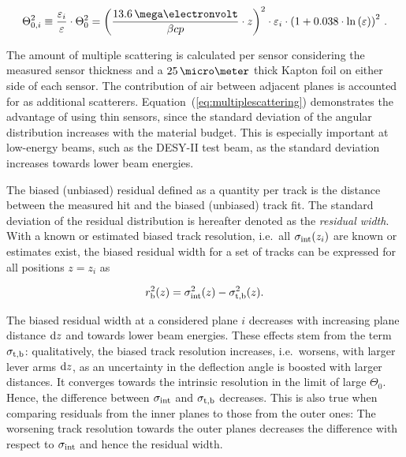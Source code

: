 \begin{equation}
\label{eq:multiplescattering}
\Theta_{0,i}^{2} \equiv \dfrac{\varepsilon_i}{\varepsilon} \cdot \Theta_{0}^{2} = \left( \frac{13.6\,\mega\electronvolt}{\beta c p} \cdot z \right)^2
\cdot \varepsilon_i
\cdot \left( 1 + 0.038 \cdot \ln{\left( \varepsilon \right) } \right)^2 \,.
\end{equation}

The amount of multiple scattering is calculated per sensor considering the measured sensor thickness and a $25\,\micro\meter$ thick Kapton foil on either side of each sensor.
The contribution of air between adjacent planes is accounted for as additional scatterers. 
Equation~(\ref{eq:multiplescattering}) demonstrates the advantage of using thin sensors, since the standard deviation of the angular distribution increases with the material budget.
This is especially important at low-energy beams, such as the DESY-II test beam, as the standard deviation increases towards lower beam energies.

The biased (unbiased) residual defined as a quantity per track is the distance between the measured hit and the biased (unbiased) track fit. 
The standard deviation of the residual distribution is hereafter denoted as the \textit{residual width}. 
With a known or estimated biased track resolution, i.e.\ all $\sigma_{\textrm{int}}(z_i)$ are known or estimates exist,
 the \textrm{biased} residual width for a set of tracks can be expressed for all positions $z = z_i$ as

\begin{equation}
 \label{eq:telescoperesolutionequation1}
 r_{\textrm{b}}^2(z) = \sigma_{\textrm{int}}^2(z) - \sigma_{\textrm{t,b}}^2(z).
\end{equation}

\noindent
The biased residual width at a considered plane $i$ decreases with increasing plane distance $\textrm{d}z$ and towards lower beam energies. 
These effects stem from the term $\sigma_{\textrm{t,b}}$: 
qualitatively, the biased track resolution increases, i.e.\ worsens, with larger lever arms $\textrm{d}z$, as an uncertainty in the deflection angle is boosted with larger distances. 
It converges towards the intrinsic resolution in the limit of large $\Theta_0$. 
Hence, the difference between $\sigma_{\textrm{int}}$ and $\sigma_{\textrm{t,b}}$ decreases. 
This is also true when comparing residuals from the inner planes to those from the outer ones:
The worsening track resolution towards the outer planes decreases the difference with respect to $\sigma_{\textrm{int}}$ and hence the residual width. 

